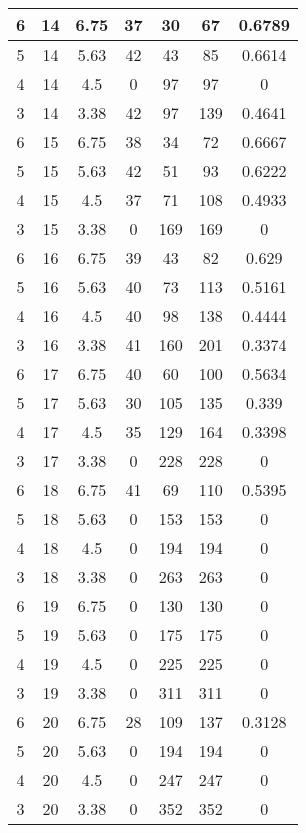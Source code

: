 \documentclass[letterpaper, 12pt]{article}
\begin{document}
\begin{longtable}{|c|c|c|c|c|c|c|}
\hline
6 & 14 & 6.75 & 37 & 30 & 67 & 0.6789 \\
\hline
5 & 14 & 5.63 & 42 & 43 & 85 & 0.6614 \\
\hline
4 & 14 & 4.5 & 0 & 97 & 97 & 0 \\
\hline
3 & 14 & 3.38 & 42 & 97 & 139 & 0.4641 \\
\hline
6 & 15 & 6.75 & 38 & 34 & 72 & 0.6667 \\
\hline
5 & 15 & 5.63 & 42 & 51 & 93 & 0.6222 \\
\hline
4 & 15 & 4.5 & 37 & 71 & 108 & 0.4933 \\
\hline
3 & 15 & 3.38 & 0 & 169 & 169 & 0 \\
\hline
6 & 16 & 6.75 & 39 & 43 & 82 & 0.629 \\
\hline
5 & 16 & 5.63 & 40 & 73 & 113 & 0.5161 \\
\hline
4 & 16 & 4.5 & 40 & 98 & 138 & 0.4444 \\
\hline
3 & 16 & 3.38 & 41 & 160 & 201 & 0.3374 \\
\hline
6 & 17 & 6.75 & 40 & 60 & 100 & 0.5634 \\
\hline
5 & 17 & 5.63 & 30 & 105 & 135 & 0.339 \\
\hline
4 & 17 & 4.5 & 35 & 129 & 164 & 0.3398 \\
\hline
3 & 17 & 3.38 & 0 & 228 & 228 & 0 \\
\hline
6 & 18 & 6.75 & 41 & 69 & 110 & 0.5395 \\
\hline
5 & 18 & 5.63 & 0 & 153 & 153 & 0 \\
\hline
4 & 18 & 4.5 & 0 & 194 & 194 & 0 \\
\hline
3 & 18 & 3.38 & 0 & 263 & 263 & 0 \\
\hline
6 & 19 & 6.75 & 0 & 130 & 130 & 0 \\
\hline
5 & 19 & 5.63 & 0 & 175 & 175 & 0 \\
\hline
4 & 19 & 4.5 & 0 & 225 & 225 & 0 \\
\hline
3 & 19 & 3.38 & 0 & 311 & 311 & 0 \\
\hline
6 & 20 & 6.75 & 28 & 109 & 137 & 0.3128 \\
\hline
5 & 20 & 5.63 & 0 & 194 & 194 & 0 \\
\hline
4 & 20 & 4.5 & 0 & 247 & 247 & 0 \\
\hline
3 & 20 & 3.38 & 0 & 352 & 352 & 0 \\
\hline
\end{longtable}
\end{document}
